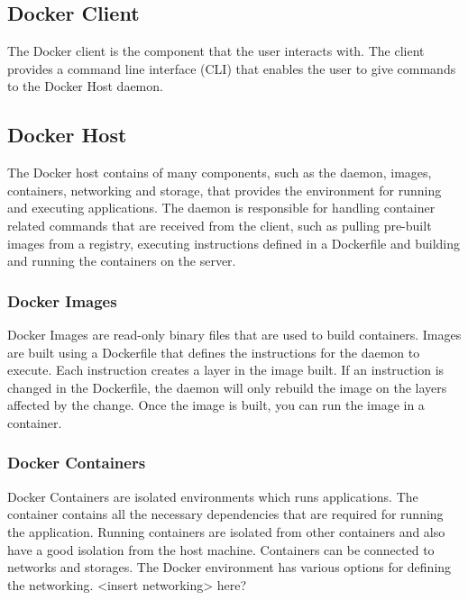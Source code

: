 \documentclass[fleqn,12pt]{olplainarticle}
\begin{document}
\subsection*{Docker Client}

The Docker client is the component that the user interacts with. The client provides a command line interface (CLI) that enables the user to give commands to the Docker Host daemon.

\subsection*{Docker Host}

The Docker host contains of many components, such as the daemon, images, containers, networking and storage, that provides the environment for running and executing applications\cite{aquasec:docker_architecture}. The daemon is responsible for handling container related commands that are received from the client, such as pulling pre-built images from a registry, executing instructions defined in a Dockerfile and building and running the containers on the server.

\subsubsection*{Docker Images}

Docker Images are read-only binary files that are used to build containers\cite{docker:overview}. Images are built using a Dockerfile that defines the instructions for the daemon to execute. Each instruction creates a layer in the image built. If an instruction is changed in the Dockerfile, the daemon will only rebuild the image on the layers affected by the change. Once the image is built, you can run the image in a container.

\subsubsection*{Docker Containers}

Docker Containers are isolated environments which runs applications\cite{aquasec:docker_architecture}. The container contains all the necessary dependencies that are required for running the application. Running containers are isolated from other containers and also have a good isolation from the host machine\cite{docker:security}. Containers can be connected to networks and storages\cite{aquasec:docker_architecture}. The Docker environment has various options for defining the networking. <insert networking> here?
\end{document}
